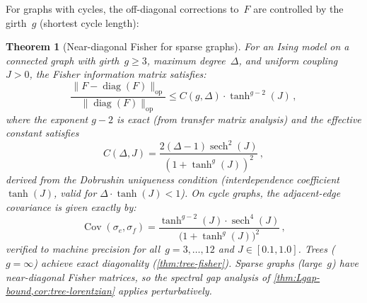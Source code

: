 \documentclass[11pt]{article}
\newtheorem{theorem}{Theorem}[section]
\theoremstyle{definition}
\theoremstyle{remark}
\begin{document}
For graphs with cycles, the off-diagonal corrections to~$F$ are
controlled by the girth~$g$ (shortest cycle length):

\begin{theorem}[Near-diagonal Fisher for sparse graphs]
\label{thm:near-diagonal-fisher}
For an Ising model on a connected graph with girth~$g \geq 3$,
maximum degree~$\Delta$, and uniform coupling~$J > 0$, the Fisher
information matrix satisfies:
\begin{equation}
\label{eq:near-diagonal-bound}
\frac{\|F - \operatorname{diag}(F)\|_{\text{op}}}
     {\|\operatorname{diag}(F)\|_{\text{op}}}
\leq C(g, \Delta) \cdot \tanh^{g-2}(J)\,,
\end{equation}
where the exponent $g - 2$ is exact (from transfer matrix analysis)
and the effective constant satisfies
\begin{equation}
\label{eq:C-derived}
C(\Delta, J) = \frac{2(\Delta - 1)\operatorname{sech}^2(J)}{(1 + \tanh^g(J))^2}\,,
\end{equation}
derived from the Dobrushin uniqueness condition
(interdependence coefficient $\tanh(J)$, valid for
$\Delta \cdot \tanh(J) < 1$).
On cycle graphs, the adjacent-edge covariance is given exactly by:
\begin{equation}
\label{eq:adjacent-edge-cov}
\operatorname{Cov}(\sigma_e, \sigma_f)
= \frac{\tanh^{g-2}(J) \cdot \operatorname{sech}^4(J)}
       {\bigl(1 + \tanh^g(J)\bigr)^2}\,,
\end{equation}
verified to machine precision for all~$g = 3, \ldots, 12$ and
$J \in [0.1, 1.0]$.
Trees ($g = \infty$) achieve exact diagonality
(\cref{thm:tree-fisher}).
Sparse graphs (large~$g$) have near-diagonal Fisher matrices, so the
spectral gap analysis of
\cref{thm:Lgap-bound,cor:tree-lorentzian} applies perturbatively.
\end{theorem}
\end{document}
